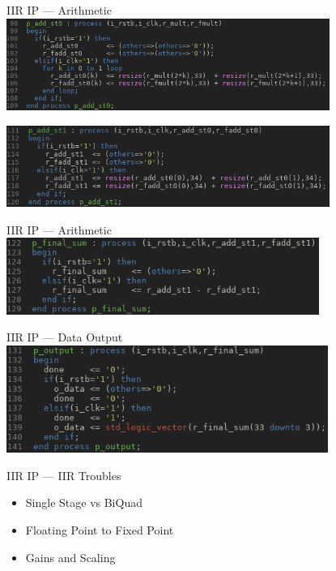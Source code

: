 \documentclass{beamer}
\begin{document}
\begin{frame}{IIR IP --- Arithmetic}
  \includegraphics[height=3cm]
                  {add0.png}

  \includegraphics[height=2.66cm]
                  {add1.png}
\end{frame}
\begin{frame}{IIR IP --- Arithmetic}
  \includegraphics[height=2.5cm]
                  {final-add.png}
\end{frame}
\begin{frame}{IIR IP --- Data Output}
  \includegraphics[height=3.5cm]
                  {output.png}
\end{frame}
\begin{frame}{IIR IP --- IIR Troubles }
  \begin{itemize}[<+>]
  \item Single Stage vs BiQuad
  \item Floating Point to Fixed Point
  \item Gains and Scaling
  \end{itemize}
\end{frame}
\end{document}
